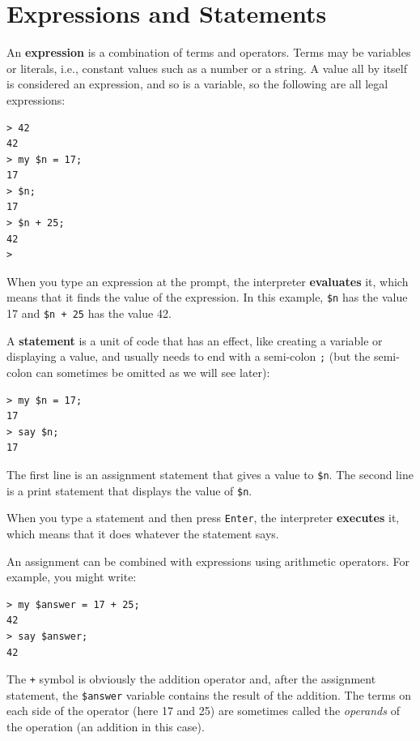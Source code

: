 \section{Expressions and Statements}
\label{expr_and_statements}

An {\bf expression} is a combination of terms and operators.
Terms may be variables or literals, i.e., constant values such as a number or a string. A value all by itself is considered an expression, and so is
a variable, so the following are all legal expressions:

\begin{verbatim}
> 42
42
> my $n = 17;
17
> $n;
17
> $n + 25;
42
>
\end{verbatim}
%
When you type an expression at the prompt, the interpreter
{\bf evaluates} it, which means that it finds the value of
the expression.
In this example, {\tt \$n} has the value 17 and
{\tt \$n + 25} has the value 42.

A {\bf statement} is a unit of code that has an effect, like
creating a variable or displaying a value, and usually needs to end 
with a semi-colon {\tt ;} (but the semi-colon can sometimes be omitted 
as we will see later):

\begin{verbatim}
> my $n = 17;
17
> say $n;
17
\end{verbatim}
%

The first line is an assignment statement that gives a value to
{\tt \$n}.  The second line is a print statement that displays the
value of {\tt \$n}.

When you type a statement and then press {\tt Enter}, the 
interpreter {\bf executes} it, which means that it does 
whatever the statement says.

An assignment can be combined with expressions using arithmetic 
operators. For example, you might write:

\begin{verbatim}
> my $answer = 17 + 25;
42
> say $answer;
42
\end{verbatim}
%

The \verb'+' symbol is obviously the addition operator 
and, after the assignment statement, the \verb'$answer' 
variable contains the result 
of the addition. The terms on each side of the operator 
(here 17 and 25) are sometimes called the \emph{operands} 
of the operation (an addition in this case).

